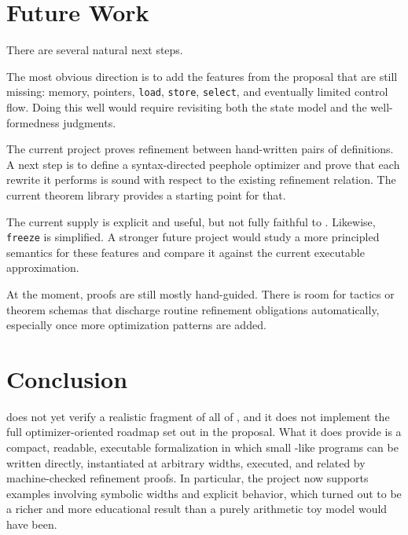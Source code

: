 \section{Future Work}
\label{sec:futurework}

There are several natural next steps.

The most obvious direction is to add the features from the proposal that are
still missing: memory, pointers, \texttt{load}, \texttt{store},
\texttt{select}, and eventually limited control flow. Doing this well would
require revisiting both the state model and the well-formedness judgments.

The current project proves refinement between hand-written pairs of
definitions. A next step is to define a syntax-directed peephole optimizer and
prove that each rewrite it performs is sound with respect to the existing
refinement relation. The current theorem library provides a starting point for
that.

The current \vundef supply is explicit and useful, but not fully faithful to
\llvm. Likewise, \texttt{freeze} is simplified. A stronger future project would
study a more principled semantics for these features and compare it against the
current executable approximation.

At the moment, proofs are still mostly hand-guided. There is room for tactics
or theorem schemas that discharge routine refinement obligations automatically,
especially once more optimization patterns are added.

\section{Conclusion}
\label{sec:conclusion}

\proj does not yet verify a realistic fragment of all
of \llvm, and it does not implement the full optimizer-oriented roadmap set out
in the proposal. What it does provide is a compact, readable, executable \lean
formalization in which small \llvm-like programs can be written directly,
instantiated at arbitrary widths, executed, and related by machine-checked
refinement proofs. In particular, the project now supports examples involving
symbolic widths and explicit \vundef behavior, which turned out to be a richer
and more educational result than a purely arithmetic toy model would have
been.
